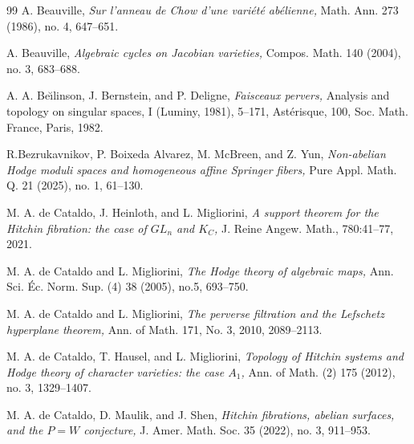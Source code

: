 \documentclass{pspum-l}
\theoremstyle{plain}
\theoremstyle{definition}
\theoremstyle{remark}
\begin{document}
\begin{thebibliography}{99}
 A. Beauville, {\em Sur l'anneau de Chow d’une vari\'et\'e ab\'elienne,} Math. Ann. 273 (1986), no. 4, 647--651.

 A. Beauville, {\em Algebraic cycles on Jacobian varieties,} Compos. Math. 140 (2004), no. 3, 683--688.



 A. A. Be\u{\i}linson, J. Bernstein, and P. Deligne, {\em Faisceaux pervers,} Analysis and topology on singular spaces, I (Luminy, 1981), 5--171, Ast\'erisque, 100, Soc. Math. France, Paris, 1982.

 R.Bezrukavnikov, P. Boixeda Alvarez, M. McBreen, and Z. Yun, {\em Non-abelian Hodge moduli spaces and homogeneous affine Springer fibers,} Pure Appl. Math. Q. 21 (2025), no. 1, 61--130. 



 M. A. de Cataldo, J. Heinloth, and L. Migliorini, {\em A support theorem for the Hitchin fibration: the case of $GL_n$
and $K_C$,} J. Reine Angew. Math., 780:41--77, 2021.

 M. A. de Cataldo and L. Migliorini, {\em The Hodge theory of algebraic maps,} Ann. Sci. \'Ec. Norm. Sup. (4) 38 (2005), no.5, 693--750.


 M. A. de Cataldo and L. Migliorini, {\em The perverse filtration and the Lefschetz hyperplane theorem,} Ann. of Math. 171, No. 3, 2010, 2089--2113.

 {M. A. de Cataldo}, {T. Hausel}, and {L. Migliorini}, {\em Topology of Hitchin systems and Hodge theory of character varieties: the case $A_1$,} Ann. of Math. (2) 175 (2012), no. 3, 1329--1407.




 M. A. de Cataldo, D. Maulik, and J. Shen, {\em Hitchin fibrations, abelian surfaces, and the $P = W$ conjecture,} J. Amer. Math. Soc. 35 (2022), no. 3, 911--953.



\end{thebibliography}
\end{document}
